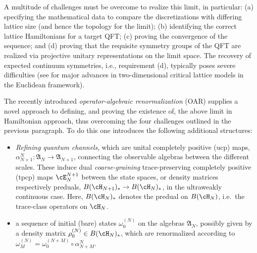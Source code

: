 \documentclass[a4paper, 11pt]{article}
\newcommand{\fA}{\mathfrak{A}}\newcommand{\cA}{\mathcal{A}}\newcommand{\dA}{\mathds{A}}\newcommand{\sA}{\mathscr{A}}
\DeclareMathOperator{\1}{\mathds{1}}
\begin{document}
A multitude of challenges must be overcome to realize this limit, in particular: (a) specifying the mathematical data to compare the discretizations with differing lattice size (and hence the topology for the limit); (b) identifying the correct lattice Hamiltonians for a target QFT; (c) proving the convergence of the sequence; and (d) proving that the requisite symmetry groups of the QFT are realized via projective unitary representations on the limit space. The recovery of expected continuum symmetries, i.e., requirement (d), typically poses severe difficulties (see \cite{SmirnovTowardsConformalInvariance, ChelkakUniversalityInThe, HonglerConformalFieldTheory, DuminilCopinRotationalInvarianceIn} for major advances in two-dimensional critical lattice models in the Euclidean framework).

The recently introduced \emph{operator-algebraic renormalization} (OAR) \cite{StottmeisterOperatorAlgebraicRenormalization, MorinelliScalingLimitsOf, BrothierConstructionsOfConformal} supplies a novel approach to defining, and proving the existence of, the above limit in Hamiltonian approach, thus overcoming the four challenges outlined in the previous paragraph. To do this one introduces the following additional structures:
\begin{itemize}
	\item \emph{Refining quantum channels}, which are unital completely positive (ucp) maps, $\alpha^{N}_{N+1}:\fA_{N}\rightarrow\fA_{N+1}$, connecting the observable algebras between the different scales. These induce dual \emph{coarse-graining} trace-preserving completely positive (tpcp) maps $\cE^{N+1}_{N}$ between the state spaces, or density matrices respectively preduals, $B(\cH_{N+1})_{*}\rightarrow B(\cH_{N})_{*}$, in the ultraweakly continuous case. Here, $B(\cH_{N})_{*}$ denotes the predual on $B(\cH_{N})$, i.e.~the trace-class operators on $\cH_{N}$.
	\item a sequence of initial (bare) states $\omega^{(N)}_{0}$ on the algebras $\mathfrak{A}_N$, possibly given by a density matrix $\rho^{(N)}_{0}\in B(\cH_{N})_{*}$, which are renormalized according to $\omega^{(N)}_{M} = \omega^{(N+M)}_{0}\circ\alpha^{N}_{N+M}$.
\end{itemize}
\end{document}
